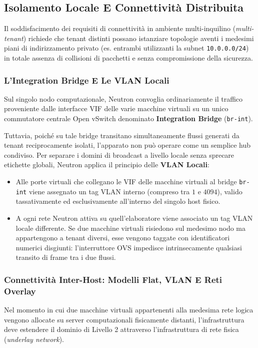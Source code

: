 \documentclass[11pt, a4paper]{article}
\begin{document}
\subsection{Isolamento Locale E Connettività Distribuita}

Il soddisfacimento dei requisiti di connettività in ambiente multi-inquilino (\emph{multi-tenant}) richiede che tenant distinti possano istanziare topologie aventi i medesimi piani di indirizzamento privato (es. entrambi utilizzanti la subnet \texttt{10.0.0.0/24}) in totale assenza di collisioni di pacchetti e senza compromissione della sicurezza.

\subsubsection{L'Integration Bridge E Le VLAN Locali}

Sul singolo nodo computazionale, Neutron convoglia ordinariamente il traffico proveniente dalle interfacce VIF delle varie macchine virtuali su un unico commutatore centrale Open vSwitch denominato \textbf{Integration Bridge} (\texttt{br-int}).

Tuttavia, poiché su tale bridge transitano simultaneamente flussi generati da tenant reciprocamente isolati, l'apparato non può operare come un semplice hub condiviso. Per separare i domini di broadcast a livello locale senza sprecare etichette globali, Neutron applica il principio delle \textbf{VLAN Locali}:
\begin{itemize}
    \item Alle porte virtuali che collegano le VIF delle macchine virtuali al bridge \texttt{br-int} viene assegnato un tag VLAN interno (compreso tra $1$ e $4094$), valido tassativamente ed esclusivamente all'interno del singolo host fisico.
    \item A ogni rete Neutron attiva su quell'elaboratore viene associato un tag VLAN locale differente. Se due macchine virtuali risiedono sul medesimo nodo ma appartengono a tenant diversi, esse vengono taggate con identificatori numerici disgiunti: l'interruttore OVS impedisce intrinsecamente qualsiasi transito di frame tra i due flussi.
\end{itemize}

\subsubsection{Connettività Inter-Host: Modelli Flat, VLAN E Reti Overlay}

Nel momento in cui due macchine virtuali appartenenti alla medesima rete logica vengono allocate su server computazionali fisicamente distanti, l'infrastruttura deve estendere il dominio di Livello 2 attraverso l'infrastruttura di rete fisica (\emph{underlay network}).
\end{document}
